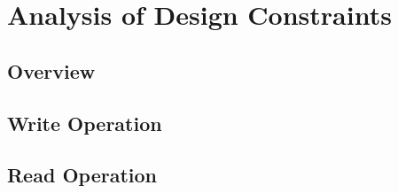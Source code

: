 \vspace{10pt}
\section{Analysis of Design Constraints}\label{sec:wr} 
\subsection{Overview}
\subsection{Write Operation}
\subsection{Read Operation}